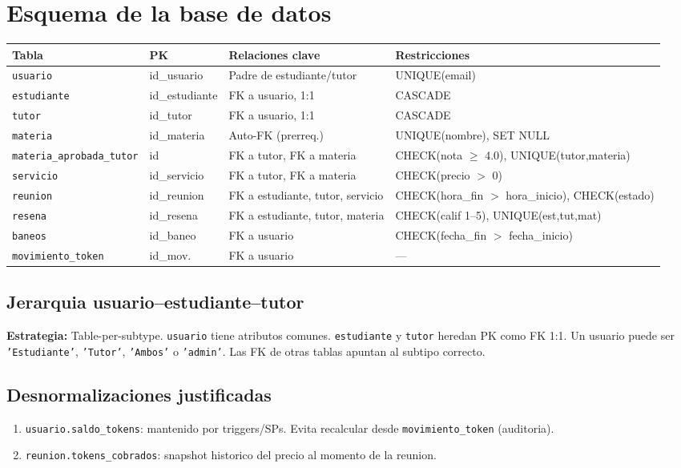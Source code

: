 \documentclass[10pt,a4paper]{article}
\begin{document}
\section{Esquema de la base de datos}
\begin{longtable}{llp{4cm}l}
\toprule
\textbf{Tabla} & \textbf{PK} & \textbf{Relaciones clave} & \textbf{Restricciones} \\
\midrule
\texttt{usuario} & id\_usuario & Padre de estudiante/tutor & UNIQUE(email) \\
\texttt{estudiante} & id\_estudiante & FK a usuario, 1:1 & CASCADE \\
\texttt{tutor} & id\_tutor & FK a usuario, 1:1 & CASCADE \\
\texttt{materia} & id\_materia & Auto-FK (prerreq.) & UNIQUE(nombre), SET NULL \\
\texttt{materia\_aprobada\_tutor} & id & FK a tutor, FK a materia & CHECK(nota $\geq$ 4.0), UNIQUE(tutor,materia) \\
\texttt{servicio} & id\_servicio & FK a tutor, FK a materia & CHECK(precio $>$ 0) \\
\texttt{reunion} & id\_reunion & FK a estudiante, tutor, servicio & CHECK(hora\_fin $>$ hora\_inicio), CHECK(estado) \\
\texttt{resena} & id\_resena & FK a estudiante, tutor, materia & CHECK(calif 1--5), UNIQUE(est,tut,mat) \\
\texttt{baneos} & id\_baneo & FK a usuario & CHECK(fecha\_fin $>$ fecha\_inicio) \\
\texttt{movimiento\_token} & id\_mov. & FK a usuario & --- \\
\bottomrule
\end{longtable}

\subsection{Jerarquia usuario--estudiante--tutor}
\textbf{Estrategia:} Table-per-subtype. \texttt{usuario} tiene atributos comunes. \texttt{estudiante} y \texttt{tutor} heredan PK como FK 1:1. Un usuario puede ser \texttt{'Estudiante'}, \texttt{'Tutor'}, \texttt{'Ambos'} o \texttt{'admin'}. Las FK de otras tablas apuntan al subtipo correcto.

\subsection{Desnormalizaciones justificadas}
\begin{enumerate}
    \item \texttt{usuario.saldo\_tokens}: mantenido por triggers/SPs. Evita recalcular desde \texttt{movimiento\_token} (auditoria).
    \item \texttt{reunion.tokens\_cobrados}: snapshot historico del precio al momento de la reunion.
\end{enumerate}
\end{document}
